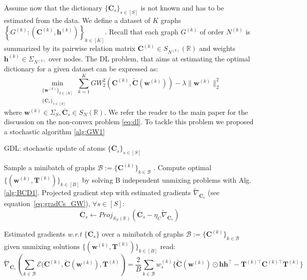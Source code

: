 \documentclass{article}
\def\eqref#1{equation~\ref{#1}}
\def\vh{{\bm{h}}}
\def\vw{{\bm{w}}}
\def\mC{{\bm{C}}}
\def\mT{{\bm{T}}}
\newcommand{\R}{\mathbb{R}}
\def\R{{\mathbb{R}}}
\begin{document}
	Assume now that the dictionary $\{\overline{\mC}_s\}_{s \in [S]}$ is not known
	and has to be estimated from the data.
	We define a dataset of $K$ graphs $\left\{ G^{(k)} :
	(\mC^{(k)},\vh^{(k)}) \right\}_{k \in [K]}$. Recall that each graph $G^{(k)}$ of
	order $N^{(k)}$ is summarized by its pairwise relation matrix $\mC^{(k)} \in
	S_{N^{(k)}}(\R)$ and weights $\vh^{(k)} \in \Sigma_{N^{(k)}}$ over nodes.
	The DL problem, that aims at estimating the optimal dictionary
	for a given dataset can be expressed as:
	\begin{equation}
	\min_{\begin{smallmatrix}\{\vw^{(k)}\}_{k\in [K]} \\
		\{\overline{\mC}_s\}_{s \in [S]} \end{smallmatrix}} \sum_{k=1}^K GW^2_2\left(\mC^{(k)},\widetilde{\mC}(\vw^{(k)})\right)- \lambda \|\vw^{(k)}\|^2_2 \label{eq:dl}
	\end{equation}
	where $\vw^{(k)} \in \Sigma_S, \overline{\mC}_s \in S_N(\R)$. We refer the reader to the main paper for the discussion on the non-convex problem \ref{eq:dl}. To tackle this problem we proposed a stochastic algorithm \ref{alg:GW1}
	
	\begin{algorithm}[h]
		\caption{GDL: stochastic update of atoms $\{\overline{\mC}_s\}_{s\in [S]}$}
		\label{alg:GW1}
		\begin{algorithmic}[1]
			\STATE Sample a minibatch of graphs $\mathcal{B} :=\{\mC^{(k)}\}_{k \in \mathcal{B}}$ .
			\STATE Compute optimal $\{(\vw^{(k)},\mT^{(k)})\}_{k \in [B]}$ by solving B independent unmixing problems with Alg.\ref{alg:BCD1}. 
			\STATE Projected gradient step with estimated gradients $\widetilde{\nabla}_{\overline{\mC}_s}$ (see \eqref{eq:gradCs_GW}), $\forall s \in [S]$: \vspace{-2mm}
			\begin{equation}
			\overline{\mC}_s \leftarrow Proj_{S_N(\R)}( \overline{\mC}_s - \eta_C \widetilde{\nabla}_{\overline{\mC}_s} )
			\end{equation}
		\end{algorithmic}
	\end{algorithm}
	Estimated gradients \emph{w.r.t} $\{\overline{\mC_s}\}$ over a minibatch of graphs $\mathcal{B} :=\{\mC^{(k)}\}_{k \in \mathcal{B}}$ given unmixing solutions $\{(\vw^{(k)},\mT^{(k)})\}_{k \in [B]}$ read:
	\begin{equation}\label{eq:gradCs_GW}
	\widetilde{\nabla}_{\overline{\mC_{s}}}\left(\sum_{k\in \mathcal{B}}\mathcal{E}(\mC^{(k)}, \widetilde{\mC}(\vw^{(k)}), \mT^{(k)}\right) = \frac{2}{B} \sum_{k \in \mathcal{B}} w^{(k)}_s \{ \widetilde{\mC}(\vw^{(k)}) \odot \vh \vh^\top -  \mT^{{(k)}\top}\mC^{(k)\top}  \mT^{(k)}\}
	\end{equation}
\end{document}
